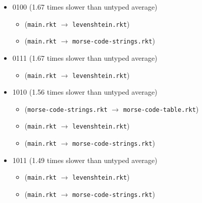 \documentclass{article}
\newcommand{\mono}[1]{\texttt{#1}}
\begin{document}
\begin{itemize}
\item 0100 (1.67 times slower than untyped average)
  \begin{itemize}
  \item (\mono{main.rkt} $\rightarrow$ \mono{levenshtein.rkt})
  \item (\mono{main.rkt} $\rightarrow$ \mono{morse-code-strings.rkt})
  \end{itemize}
\item 0111 (1.67 times slower than untyped average)
  \begin{itemize}
  \item (\mono{main.rkt} $\rightarrow$ \mono{levenshtein.rkt})
  \end{itemize}
\item 1010 (1.56 times slower than untyped average)
  \begin{itemize}
  \item (\mono{morse-code-strings.rkt} $\rightarrow$ \mono{morse-code-table.rkt})
  \item (\mono{main.rkt} $\rightarrow$ \mono{levenshtein.rkt})
  \item (\mono{main.rkt} $\rightarrow$ \mono{morse-code-strings.rkt})
  \end{itemize}
\item 1011 (1.49 times slower than untyped average)
  \begin{itemize}
  \item (\mono{main.rkt} $\rightarrow$ \mono{levenshtein.rkt})
  \item (\mono{main.rkt} $\rightarrow$ \mono{morse-code-strings.rkt})
  \end{itemize}


\end{itemize}
\end{document}
